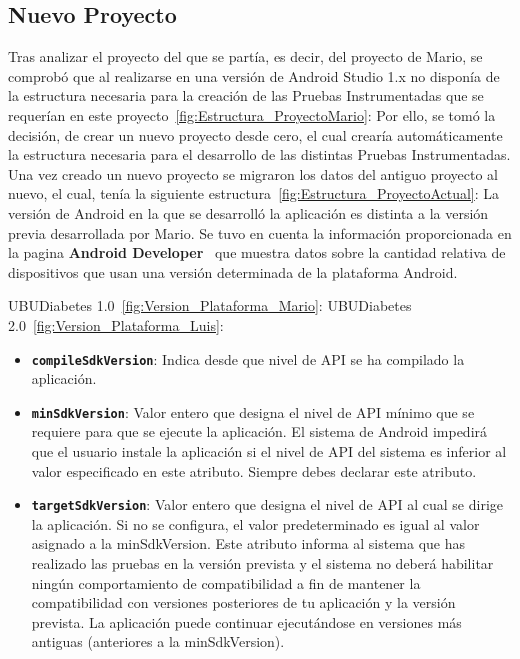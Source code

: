 \subsection{Nuevo Proyecto}
Tras analizar el proyecto del que se partía, es decir, del proyecto de Mario, se comprobó que al realizarse en una versión de Android Studio 1.x no disponía de la estructura necesaria para la creación de las Pruebas Instrumentadas que se requerían en este proyecto~\ref{fig:Estructura_ProyectoMario}:
Por ello, se tomó la decisión, de crear un nuevo proyecto desde cero, el cual crearía automáticamente la estructura necesaria para el desarrollo de las distintas Pruebas Instrumentadas. Una vez creado un nuevo proyecto se migraron los datos del antiguo proyecto al nuevo, el cual, tenía la siguiente estructura~\ref{fig:Estructura_ProyectoActual}:
La versión de Android en la que se desarrolló la aplicación es distinta a la versión previa desarrollada por Mario. Se tuvo en cuenta la información proporcionada en la pagina \textbf{Android Developer}~\cite{androiddeveloper} que muestra datos sobre la cantidad relativa de dispositivos que usan una versión determinada de la plataforma Android.

UBUDiabetes 1.0~\ref{fig:Version_Plataforma_Mario}:
UBUDiabetes 2.0~\ref{fig:Version_Plataforma_Luis}:
\begin{itemize}
	\item \textbf{\texttt{compileSdkVersion}}: Indica desde que nivel de API se ha compilado la aplicación.
	\item \textbf{\texttt{minSdkVersion}}: Valor entero que designa el nivel de API mínimo que se requiere para que se ejecute la aplicación. El sistema de Android impedirá que el usuario instale la aplicación si el nivel de API del sistema es inferior al valor especificado en este atributo. Siempre debes declarar este atributo.
	\item \textbf{\texttt{targetSdkVersion}}: Valor entero que designa el nivel de API al cual se dirige la aplicación. Si no se configura, el valor predeterminado es igual al valor asignado a la minSdkVersion.
Este atributo informa al sistema que has realizado las pruebas en la versión prevista y el sistema no deberá habilitar ningún comportamiento de compatibilidad a fin de mantener la compatibilidad con versiones posteriores de tu aplicación y la versión prevista. La aplicación puede continuar ejecutándose en versiones más antiguas (anteriores a la minSdkVersion).
\end{itemize}
